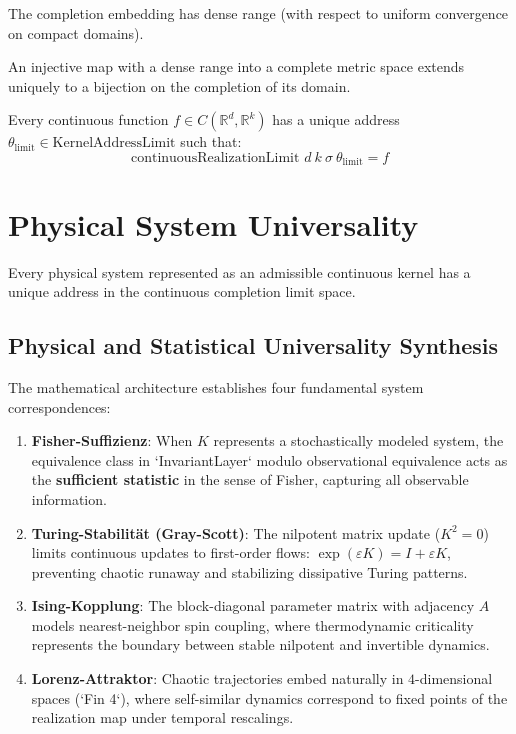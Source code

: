 \begin{theorem}
The completion embedding has dense range (with respect to uniform convergence on compact domains).
\end{theorem}

\begin{axiom}
An injective map with a dense range into a complete metric space extends uniquely to a bijection on the completion of its domain.
\end{axiom}

\begin{theorem}
Every continuous function $f \in C(\mathbb{R}^d, \mathbb{R}^k)$ has a unique address $\theta_{\text{limit}} \in \text{KernelAddressLimit}$ such that:
$$\text{continuousRealizationLimit } d\ k\ \sigma\ \theta_{\text{limit}} = f$$
\end{theorem}

\section{Physical System Universality}

\begin{theorem}
Every physical system represented as an admissible continuous kernel has a unique address in the continuous completion limit space.
\end{theorem}

\subsection{Physical and Statistical Universality Synthesis}
The mathematical architecture establishes four fundamental system correspondences:
\begin{enumerate}
    \item \textbf{Fisher-Suffizienz}: When $K$ represents a stochastically modeled system, the equivalence class in `InvariantLayer` modulo observational equivalence acts as the \textbf{sufficient statistic} in the sense of Fisher, capturing all observable information.
    \item \textbf{Turing-Stabilität (Gray-Scott)}: The nilpotent matrix update ($K^2 = 0$) limits continuous updates to first-order flows: $\exp(\varepsilon K) = I + \varepsilon K$, preventing chaotic runaway and stabilizing dissipative Turing patterns.
    \item \textbf{Ising-Kopplung}: The block-diagonal parameter matrix with adjacency $A$ models nearest-neighbor spin coupling, where thermodynamic criticality represents the boundary between stable nilpotent and invertible dynamics.
    \item \textbf{Lorenz-Attraktor}: Chaotic trajectories embed naturally in $4$-dimensional spaces (`Fin 4`), where self-similar dynamics correspond to fixed points of the realization map under temporal rescalings.
\end{enumerate}
